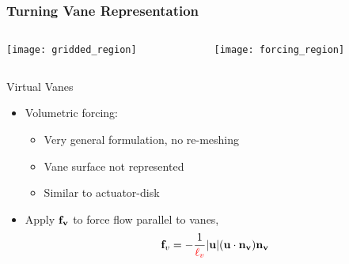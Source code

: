 \documentclass[mathserif]{beamer}
\begin{document}
%
%
%
\begin{frame}
\frametitle{Turning Vane Representation}

\begin{columns}[]
  \begin{column}{0.5\linewidth}

   \begin{center}
    \texttt{[image: gridded\_region]}
   \end{center}

  \end{column}

  \begin{column}{0.5\linewidth}
   \begin{center}
    \texttt{[image: forcing\_region]}
   \end{center}

  \end{column}
\end{columns}


 \begin{block}{Virtual Vanes}

  \begin{itemize}
   \item Volumetric forcing: 
	 \begin{itemize}
	  \item Very general formulation, no re-meshing 
	  \item Vane surface not represented
	  \item Similar to actuator-disk
	 \end{itemize}	 
%  
   \item Apply ${\bf f_v}$ to force flow parallel to vanes,
	 \begin{equation}
	  {\bf f}_v= -\frac{1}{\textcolor{red}{\ell_v}}|{\bf u}|({\bf u}\cdot{\bf n_v}){\bf n_v}
	 \end{equation}
  \end{itemize}
 \end{block}

\end{frame}
\end{document}
